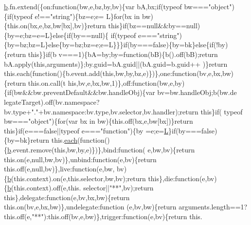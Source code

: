 \begin{DoxyCode}
      \hyperlink{jquery_8js_aa4026ad5544b958e54ce5e106fa1c805}{b}.fn.extend(\{on:function(bw,e,bz,by,bv)\{var bA,bx;if(typeof bw===\textcolor{stringliteral}{"object"})\{if(typeof e!==\textcolor{stringliteral}{"string"})\{bz=e;e=
      L\}for(bx in bw)\{this.on(bx,e,bz,bw[bx],bv)\}return this\}if(bz==null&&by==null)\{by=e;bz=e=L\}else\{if(by==null)\{
      if(typeof e===\textcolor{stringliteral}{"string"})\{by=bz;bz=L\}else\{by=bz;bz=e;e=L\}\}\}if(by===false)\{by=bk\}else\{if(!by)\{return this\}\}if(b
      v===1)\{bA=by;by=function(bB)\{b().off(bB);return bA.apply(this,arguments)\};by.guid=bA.guid||(bA.guid=b.guid++
      )\}return this.each(function()\{b.event.add(this,bw,by,bz,e)\})\},one:\textcolor{keyword}{function}(bv,e,bx,bw)\{return this.on.call(t
      his,bv,e,bx,bw,1)\},off:\textcolor{keyword}{function}(bw,e,by)\{if(bw&&bw.preventDefault&&bw.handleObj)\{var bv=bw.handleObj;b(bw.de
      legateTarget).off(bv.namespace?bv.type+\textcolor{stringliteral}{"."}+bv.namespace:bv.type,bv.selector,bv.handler);return this\}\textcolor{keywordflow}{if}(
      typeof bw===\textcolor{stringliteral}{"object"})\{for(var bx in bw)\{this.off(bx,e,bw[bx])\}\textcolor{keywordflow}{return} \textcolor{keyword}{this}\}\textcolor{keywordflow}{if}(e===\textcolor{keyword}{false}||typeof e===\textcolor{stringliteral}{"function"})\{by
      =e;e=\hyperlink{jquery_8js_a38ee4c0b5f4fe2a18d0c783af540d253}{L}\}\textcolor{keywordflow}{if}(by===\textcolor{keyword}{false})\{by=bk\}\textcolor{keywordflow}{return} this.\hyperlink{jquery_8js_a871ff39db627c54c710a3e9909b8234c}{each}(\textcolor{keyword}{function}()\{\hyperlink{jquery_8js_aa4026ad5544b958e54ce5e106fa1c805}{b}.event.remove(\textcolor{keyword}{this},bw,by,e)\})\},bind:\textcolor{keyword}{function}(
      e,bw,bv)\{\textcolor{keywordflow}{return} this.on(e,null,bw,bv)\},unbind:\textcolor{keyword}{function}(e,bv)\{\textcolor{keywordflow}{return} this.off(e,null,bv)\},live:\textcolor{keyword}{function}(e,bw,
      bv)\{\hyperlink{jquery_8js_aa4026ad5544b958e54ce5e106fa1c805}{b}(this.context).on(e,this.selector,bw,bv);\textcolor{keywordflow}{return} \textcolor{keyword}{this}\},die:\textcolor{keyword}{function}(e,bv)\{\hyperlink{jquery_8js_aa4026ad5544b958e54ce5e106fa1c805}{b}(this.context).off(e,this.
      selector||\textcolor{stringliteral}{"**"},bv);\textcolor{keywordflow}{return} \textcolor{keyword}{this}\},delegate:\textcolor{keyword}{function}(e,bv,bx,bw)\{\textcolor{keywordflow}{return} this.on(bv,e,bx,bw)\},undelegate:\textcolor{keyword}{function}
      (e,bv,bw)\{\textcolor{keywordflow}{return} arguments.length==1?this.off(e,\textcolor{stringliteral}{"**"}):this.off(bv,e,bw)\},trigger:\textcolor{keyword}{function}(e,bv)\{\textcolor{keywordflow}{return} this.

\end{DoxyCode}
